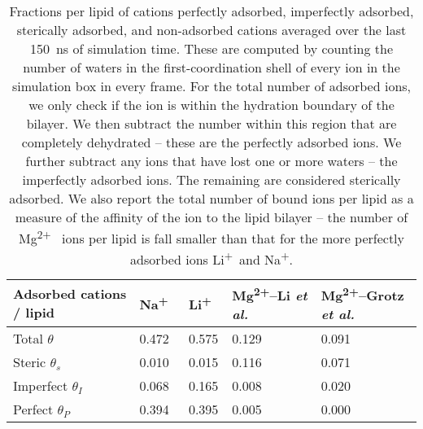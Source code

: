 \documentclass[journal=langd5,manuscript=article]{achemso}
\newcommand{\etal}{\textit{et al.}~}
\newcommand{\na}{Na\textsuperscript{+}~}
\newcommand{\li}{Li\textsuperscript{+}~}
\newcommand{\mg}{Mg\textsuperscript{2+}~}
\newcommand{\mgmbnbfix}{Mg\textsuperscript{2+}--Li \etal} %
\newcommand{\mgmicro}{Mg\textsuperscript{2+}--Grotz \etal}
\begin{document}
\begin{table}
    \caption{Fractions per lipid of cations perfectly adsorbed, imperfectly adsorbed, sterically adsorbed, and non-adsorbed cations
        {averaged over the last 150~ns of simulation time}. These are computed
    by counting the number of waters in the first-coordination shell of every ion in the simulation box in every frame. For the total number
    of adsorbed ions, we
    only check if the ion is within the hydration boundary of the bilayer. We then subtract the number within this region that are
    completely dehydrated -- these are the perfectly adsorbed ions. We further subtract any ions that have lost 
    one or more waters -- the imperfectly adsorbed
    ions. The remaining are considered sterically adsorbed. 
    We also report the total number of bound ions per lipid as a measure 
    of the affinity of the ion to the lipid bilayer -- the number of \mg
    ions per lipid is fall smaller than that for the more perfectly adsorbed ions \li and Na\textsuperscript{+}.}
    \label{tab:cationfrac}
    \begin{tabularx}{\textwidth}{|X|X|X|X|X|}\hline
    Adsorbed cations / lipid & \na & \li & \mgmbnbfix   & \mgmicro \\\hline
    Total     $\theta$       &{0.472}&{0.575}&{0.129}&{0.091}     \\\hline
    Steric    $\theta_s$     &{0.010}&{0.015}&{0.116}&{0.071}     \\\hline
    Imperfect $\theta_I$     &{0.068}&{0.165}&{0.008}&{0.020}     \\\hline
    Perfect   $\theta_P$     &{0.394}&{0.395}&{0.005}&{0.000}     \\\hline
    \end{tabularx}
\end{table}
\clearpage
\end{document}
